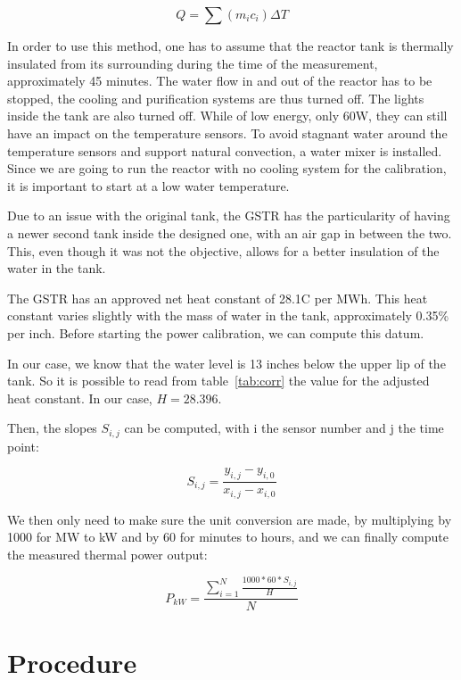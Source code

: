 \begin{equation}\label{eq2}
Q = \sum{(m_i c_i)}\Delta T
\end{equation}

In order to use this method, one has to assume that the reactor tank is thermally insulated from its surrounding during the time of the measurement, approximately 45 minutes. The water flow in and out of the reactor has to be stopped, the cooling and purification systems are thus turned off. The lights inside the tank are also turned off. While of low energy, only 60W, they can still have an impact on the temperature sensors. To avoid stagnant water around the temperature sensors and support natural convection, a water mixer is installed. Since we are going to run the reactor with no cooling system for the calibration, it is important to start at a low water temperature.

Due to an issue with the original tank, the GSTR has the particularity of having a newer second tank inside the designed one, with an air gap in between the two. This, even though it was not the objective, allows for a better insulation of the water in the tank.

The GSTR has an approved net heat constant of 28.1\degree C per MWh. This heat constant varies slightly with the mass of water in the tank, approximately 0.35\% per inch. Before starting the power calibration, we can compute this datum.

In our case, we know that the water level is 13 inches below the upper lip of the tank. So it is possible to read from table~\ref{tab:corr} the value for the adjusted heat constant. In our case, $H = 28.396$.

Then, the slopes $S_{i,j}$ can be computed, with i the sensor number and j the time point:

\begin{equation}\label{eq3}
S_{i,j} = \frac{y_{i,j} - y_{i,0}}{x_{i,j} - x_{i,0}}
\end{equation}

We then only need to make sure the unit conversion are made, by multiplying by 1000 for MW to kW and by 60 for minutes to hours, and we can finally compute the measured thermal power output:

\begin{equation}\label{eq4}
P_{kW} = \frac{\sum\limits_{i=1}^{N}{\frac{1000*60*S_{i,j}}{H}}}{N}
\end{equation}


\section{Procedure}

